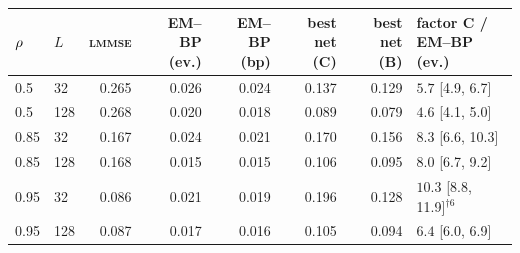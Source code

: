 \begin{tabular}{llrrrrrl}
\toprule
$\rho$ & $L$ & \textsc{lmmse} & EM--BP (ev.) & EM--BP (bp) & best net (C) & best net (B) & factor C / EM--BP (ev.) \\
\midrule
0.5 & 32 & 0.265 & 0.026 & 0.024 & 0.137 & 0.129 & $5.7$ [4.9, 6.7] \\
0.5 & 128 & 0.268 & 0.020 & 0.018 & 0.089 & 0.079 & $4.6$ [4.1, 5.0] \\
0.85 & 32 & 0.167 & 0.024 & 0.021 & 0.170 & 0.156 & $8.3$ [6.6, 10.3] \\
0.85 & 128 & 0.168 & 0.015 & 0.015 & 0.106 & 0.095 & $8.0$ [6.7, 9.2] \\
0.95 & 32 & 0.086 & 0.021 & 0.019 & 0.196 & 0.128 & $10.3$ [8.8, 11.9]$^{\dagger 6}$ \\
0.95 & 128 & 0.087 & 0.017 & 0.016 & 0.105 & 0.094 & $6.4$ [6.0, 6.9] \\
\bottomrule
\end{tabular}
